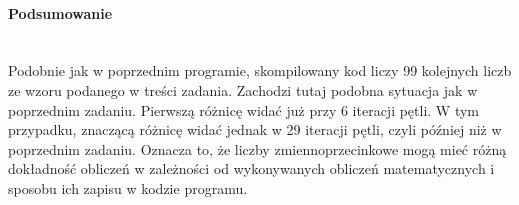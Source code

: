 \paragraph{Podsumowanie} ~\\
Podobnie jak w poprzednim programie, skompilowany kod liczy 99 kolejnych liczb ze wzoru podanego w treści zadania.
Zachodzi tutaj podobna sytuacja jak w poprzednim zadaniu.
Pierwszą różnicę widać już przy 6 iteracji pętli.
W tym przypadku, znaczącą różnicę widać jednak w 29 iteracji pętli, czyli później niż w poprzednim zadaniu.
Oznacza to, że liczby zmiennoprzecinkowe mogą mieć różną dokładność obliczeń w zależności od wykonywanych obliczeń matematycznych i sposobu ich zapisu w kodzie programu.
